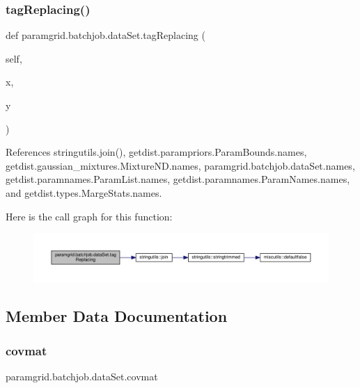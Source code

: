 \subsubsection{\texorpdfstring{tag\+Replacing()}{tagReplacing()}}
{\footnotesize\ttfamily def paramgrid.\+batchjob.\+data\+Set.\+tag\+Replacing (\begin{DoxyParamCaption}\item[{}]{self,  }\item[{}]{x,  }\item[{}]{y }\end{DoxyParamCaption})}



References stringutils.\+join(), getdist.\+parampriors.\+Param\+Bounds.\+names, getdist.\+gaussian\+\_\+mixtures.\+Mixture\+N\+D.\+names, paramgrid.\+batchjob.\+data\+Set.\+names, getdist.\+paramnames.\+Param\+List.\+names, getdist.\+paramnames.\+Param\+Names.\+names, and getdist.\+types.\+Marge\+Stats.\+names.

Here is the call graph for this function\+:
\nopagebreak
\begin{figure}[H]
\begin{center}
\leavevmode
\includegraphics[width=350pt]{classparamgrid_1_1batchjob_1_1dataSet_a8d7d924f1dccda6288c02ce9a294d5a2_cgraph}
\end{center}
\end{figure}


\subsection{Member Data Documentation}
\mbox{\label{classparamgrid_1_1batchjob_1_1dataSet_ae6ece3eca345f34b788891db79d3e342}} 
\subsubsection{\texorpdfstring{covmat}{covmat}}
{\footnotesize\ttfamily paramgrid.\+batchjob.\+data\+Set.\+covmat}

